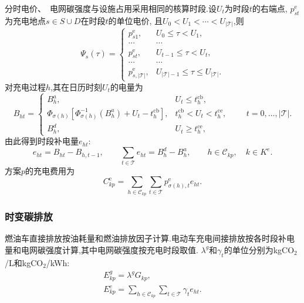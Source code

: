 \documentclass{setp-new}
\begin{document}
分时电价、~电网碳强度与设施占用采用相同的核算时段.设$U_t$为时段$t$的右端点, $p_{st}^{\mathrm e}$为充电地点$s\in S\cup D$在时段$t$的单位电价,
且$U_0<U_1<\cdots<U_{|\mathcal T|}$,则
\begin{equation}
\Psi_s(\tau)=
\begin{cases}
p_{s1}^{\mathrm e}, & U_0\le\tau<U_1,\\
\cdots & \cdots\\
p_{st}^{\mathrm e}, & U_{t-1}\le\tau<U_t,\\
\cdots & \cdots\\
p_{s,|\mathcal T|}^{\mathrm e}, & U_{|\mathcal T|-1}\le\tau\le U_{|\mathcal T|}.
\end{cases}
\label{eq:unified-price-function}
\end{equation}
对充电过程$h$,其在日历时刻$U_t$的电量为\cite{ref:12}
\begin{equation}
B_{ht}=
\begin{cases}
B_h^{a}, & U_t\le t_h^{\mathrm{cb}},\\
\Phi_{\sigma(h)}\!\left[
\Phi_{\sigma(h)}^{-1}(B_h^{a})+U_t-t_h^{\mathrm{cb}}
\right], & t_h^{\mathrm{cb}}<U_t<t_h^{\mathrm{ce}},\\
B_h^{d}, & U_t\ge t_h^{\mathrm{ce}},
\end{cases}
\qquad t=0,\ldots,|\mathcal T|.
\label{eq:unified-charge-calendar-energy}
\end{equation}
由此得到时段补电量$e_{ht}$:
\begin{equation}
e_{ht}=B_{ht}-B_{h,t-1},\qquad
\sum_{t\in\mathcal T}e_{ht}=B_h^{d}-B_h^{a},\qquad
h\in\mathcal C_{kp},\quad k\in K^{e}.
\label{eq:unified-charge-balance}
\end{equation}
方案$p$的充电费用为
\begin{equation}
C_{kp}^{\mathrm e}
=\sum_{h\in\mathcal C_{kp}}\sum_{t\in\mathcal T}
p_{\sigma(h),t}^{\mathrm e}e_{ht}.
\label{eq:unified-charge-cost}
\end{equation}

\subsubsection{时变碳排放}

燃油车直接排放按油耗量和燃油排放因子计算\cite{ref:95}.电动车充电间接排放按各时段补电量和电网碳强度计算,其中电网碳强度按充电时段取值\cite{ref:woody2021}.
$\lambda^{g}$和$\gamma_t$的单位分别为kgCO$_2$/L和kgCO$_2$/kWh:
\begin{gather}
E_{kp}^{g}=\lambda^{g}G_{kp},
\label{eq:unified-direct-emission}\\
E_{kp}^{e}=\sum_{h\in\mathcal C_{kp}}\sum_{t\in\mathcal T}\gamma_t e_{ht}.
\label{eq:unified-indirect-emission}
\end{gather}
\end{document}
